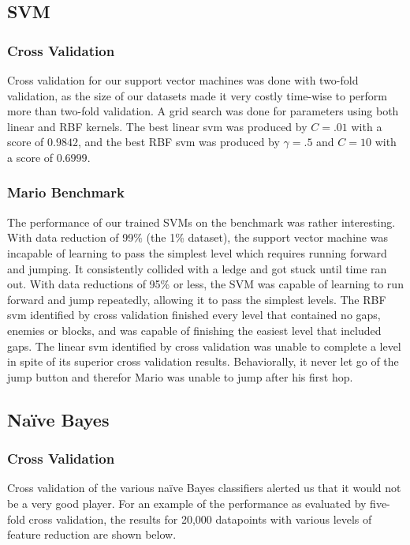 \documentclass[]{article}   %
\begin{document}
\subsection{SVM}
\subsubsection{Cross Validation}
Cross validation for our support vector machines was done with two-fold validation, as the size of our datasets made 
it very costly time-wise to perform more than two-fold validation. A grid search was done for parameters using both linear
and RBF kernels. The best linear svm was produced by $C = .01$ with a score of $0.9842$, and the best RBF svm was produced by
$\gamma = .5$ and $C = 10$ with a score of $0.6999$.

\subsubsection{Mario Benchmark}
The performance of our trained SVMs on the benchmark was rather interesting. With data reduction of 99\% (the 1\% dataset), the support
vector machine was incapable of learning to pass the simplest level which requires running forward and jumping. It consistently
collided with a ledge and got stuck until time ran out. With data reductions of 95\% or less, the SVM was capable of learning to
run forward and jump repeatedly, allowing it to pass the simplest levels. The RBF svm identified by cross validation finished every
level that contained no gaps, enemies or blocks, and was capable of finishing the easiest level that included gaps. The linear svm
identified by cross validation was unable to complete a level in spite of its superior cross validation results. Behaviorally, it
never let go of the jump button and therefor Mario was unable to jump after his first hop.

\subsection{Na\"{i}ve Bayes}
\subsubsection{Cross Validation}
Cross validation of the various na\"{i}ve Bayes classifiers alerted us that it would not be a very good player. For an example of the
performance as evaluated by five-fold cross validation, the results for 20,000 datapoints with various levels of feature reduction are
shown below.
\end{document}
